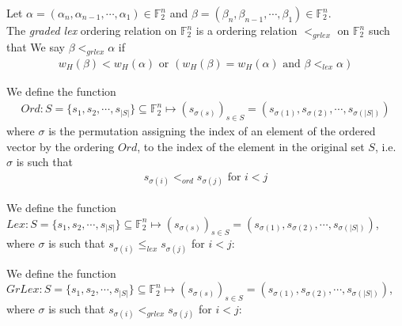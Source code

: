 \documentclass[11pt]{llncs}
\begin{document}
\begin{definition}
	Let $\alpha = (\alpha_n, \alpha_{n-1}, \cdots, \alpha_1) \in \mathbb{F}_2^n$ and $\beta = (\beta_n, \beta_{n-1}, \cdots, \beta_1) \in \mathbb{F}_2^n$.\\
	The \textit{graded lex} ordering relation on $\mathbb{F}_2^n$ is a ordering relation $<_{grlex}$ on $\mathbb{F}_2^n$ such that
	We say $\beta <_{grlex} \alpha$ if
	\begin{align*}
	w_H(\beta) < w_H(\alpha) \mbox{ or }  \left(w_H(\beta) = w_H(\alpha) \mbox{ and } \beta <_{lex} \alpha\right)
	\end{align*}
\end{definition}

\begin{definition}
	We define the function 
	\begin{align*}
	Ord: S = \{s_1, s_2, \cdots, s_{|S|}\} \subseteq \mathbb{F}_2^n \mapsto \left(s_{\sigma(s)}\right)_{s\in S} = \left(s_{\sigma(1)}, s_{\sigma(2)}, \cdots, s_{\sigma(|S|)}\right)
	\end{align*}
	where $\sigma$ is the permutation assigning the index of an element of the ordered vector by the ordering $Ord$, to the index of the element in the original set $S$, i.e. $\sigma$ is such that 
	\begin{align*}
	s_{\sigma(i)} <_{ord} s_{\sigma(j)} \mbox{ for } i<j
	\end{align*}
\end{definition}

\begin{definition}
	We define the function $Lex: S = \{s_1, s_2, \cdots, s_{|S|}\} \subseteq \mathbb{F}_2^n \mapsto \left(s_{\sigma(s)}\right)_{s\in S} = \left(s_{\sigma(1)}, s_{\sigma(2)}, \cdots, s_{\sigma(|S|)}\right)$, where $\sigma$ is such that $s_{\sigma(i)} \leq_{lex} s_{\sigma(j)}$ for $i<j$:
\end{definition}

\begin{definition}
	We define the function $GrLex: S = \{s_1, s_2, \cdots, s_{|S|}\} \subseteq \mathbb{F}_2^n \mapsto \left(s_{\sigma(s)}\right)_{s\in S} = \left(s_{\sigma(1)}, s_{\sigma(2)}, \cdots, s_{\sigma(|S|)}\right)$, where $\sigma$ is such that $s_{\sigma(i)} <_{grlex} s_{\sigma(j)}$ for $i<j$:
\end{definition}
\end{document}
